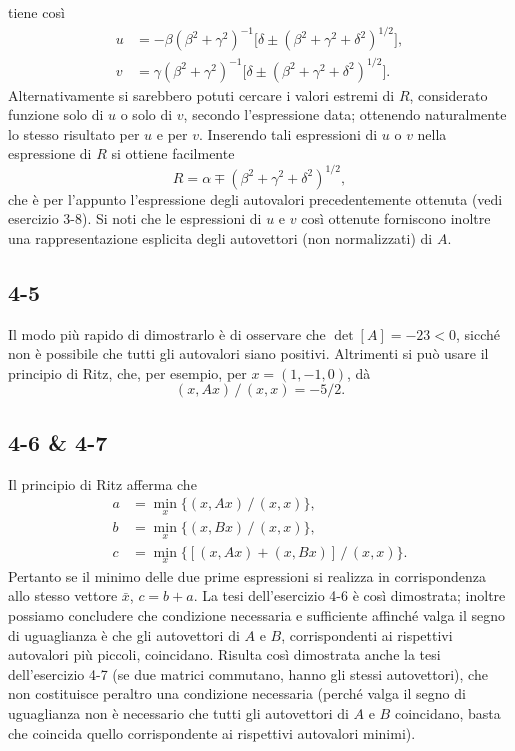 \documentclass[11pt, a4paper]{book}
\numberwithin{equation}{section}
\begin{document}

tiene così
\begin{align*}
u &= -\beta(\beta^2+\gamma^2)^{-1}
     \bigl[\delta \pm (\beta^2+\gamma^2+\delta^2)^{1/2}\bigr], \\
v &= \gamma(\beta^2+\gamma^2)^{-1}
     \bigl[\delta \pm (\beta^2+\gamma^2+\delta^2)^{1/2}\bigr].
\end{align*}
Alternativamente si sarebbero potuti cercare i valori estremi di $R$,
considerato funzione solo di $u$ o solo di $v$, secondo l'espressione
data; ottenendo naturalmente lo stesso risultato per $u$ e per $v$.
Inserendo tali espressioni di $u$ o $v$ nella espressione di $R$ si
ottiene facilmente
\[
R = \alpha \mp (\beta^2+\gamma^2+\delta^2)^{1/2},
\]
che è per l'appunto l'espressione degli autovalori precedentemente
ottenuta (vedi esercizio 3-8). Si noti che le espressioni di $u$ e $v$
così ottenute forniscono inoltre una rappresentazione esplicita degli
autovettori (non normalizzati) di $A$.

\subsection*{4-5}
Il modo più rapido di dimostrarlo è di osservare che
$\det[A] = -23 < 0$, sicché non è possibile che tutti gli autovalori
siano positivi. Altrimenti si può usare il principio di Ritz, che, per
esempio, per $x = (1,-1,0)$, dà
\[
(x,Ax)\,/\,(x,x) = -5/2.
\]

\subsection*{4-6 \& 4-7}
Il principio di Ritz afferma che
\begin{align*}
a &= \min_x\bigl\{(x,Ax)\,/\,(x,x)\bigr\}, \\
b &= \min_x\bigl\{(x,Bx)\,/\,(x,x)\bigr\}, \\
c &= \min_x\bigl\{[(x,Ax)+(x,Bx)]\,/\,(x,x)\bigr\}.
\end{align*}
Pertanto se il minimo delle due prime espressioni si realizza in
corrispondenza allo stesso vettore $\bar{x}$, $c = b+a$. La tesi
dell'esercizio 4-6 è così dimostrata; inoltre possiamo concludere che
condizione necessaria e sufficiente affinché valga il segno di
uguaglianza è che gli autovettori di $A$ e $B$, corrispondenti ai
rispettivi autovalori più piccoli, coincidano. Risulta così dimostrata
anche la tesi dell'esercizio 4-7 (se due matrici commutano, hanno gli
stessi autovettori), che non costituisce peraltro una condizione
necessaria (perché valga il segno di uguaglianza non è necessario che
tutti gli autovettori di $A$ e $B$ coincidano, basta che coincida quello
corrispondente ai rispettivi autovalori minimi).
\end{document}
